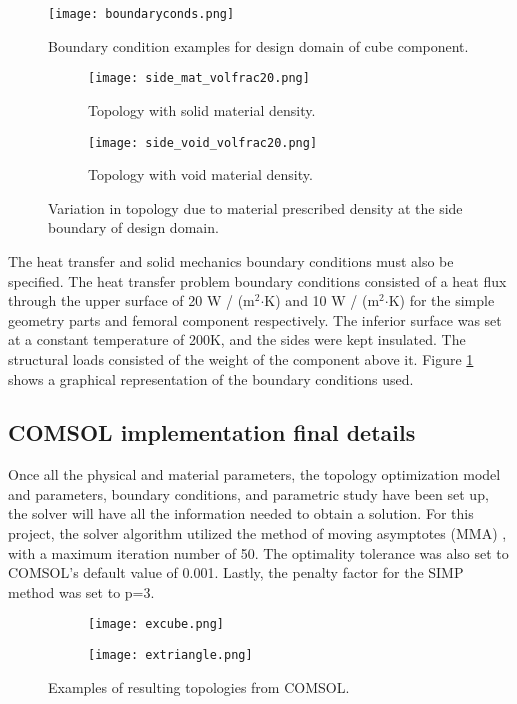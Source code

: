 \documentclass[../main.tex]{subfiles}
\begin{document}
\begin{figure}[h!]
  \centering
  \texttt{[image: boundaryconds.png]}
  \caption{Boundary condition examples for design domain of cube component.} 
  \label{fig:boundary}
\end{figure}


\begin{figure}
  \begin{subfigure}{0.45\textwidth}
    \texttt{[image: side\_mat\_volfrac20.png]}
    \caption{Topology with solid material density.}
    \label{fig:solid}
  \end{subfigure}
  \begin{subfigure}{0.45\textwidth}
    \texttt{[image: side\_void\_volfrac20.png]}
    \caption{Topology with void material density.}
    \label{fig:void}
  \end{subfigure}
  \caption{Variation in topology due to material prescribed density at the side boundary of design domain.}
\end{figure}

The heat transfer and solid mechanics boundary conditions must also be specified. The heat transfer problem boundary conditions consisted of a heat flux through the upper surface of 20 W / (m$^2$$\cdot$K) and 10 W / (m$^2$$\cdot$K) for the simple geometry parts and femoral component respectively. The inferior surface was set at a constant temperature of 200\degree K, and the sides were kept insulated. The structural loads consisted of the weight of the component above it. Figure  \ref{fig:boundary} shows a graphical representation of the boundary conditions used.

\subsection{COMSOL implementation final details}

Once all the physical and material parameters, the topology optimization model and parameters, boundary conditions, and parametric study have been set up, the solver will have all the information needed to obtain a solution. For this project, the solver algorithm utilized the method of moving asymptotes (MMA) \cite{svanbergMethodMovingAsymptotes1987}, with a maximum iteration number of 50. The optimality tolerance was also set to COMSOL's default value of 0.001. Lastly, the penalty factor for the SIMP method was set to p=3.

\begin{figure}
  \begin{subfigure}{0.45\textwidth}
    \texttt{[image: excube.png]}
  \end{subfigure}
  \begin{subfigure}{0.45\textwidth}
      \texttt{[image: extriangle.png]}
    \end{subfigure}
    \caption{Examples of resulting topologies from COMSOL.}
  \end{figure}
\end{document}
